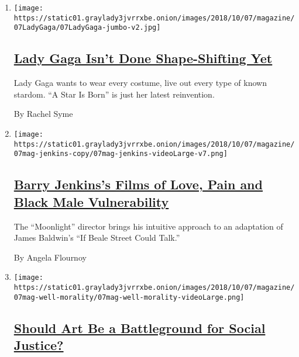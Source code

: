 \begin{enumerate}
\def\labelenumi{\arabic{enumi}.}
\item
  \texttt{[image: https://static01.graylady3jvrrxbe.onion/images/2018/10/07/magazine/07LadyGaga/07LadyGaga-jumbo-v2.jpg]}

  \hypertarget{lady-gaga-isnt-done-shape-shifting-yet}{%
  \subsection{\texorpdfstring{\href{/interactive/2018/10/03/magazine/lady-gaga-movie-star-is-born.html}{Lady
  Gaga Isn't Done Shape-Shifting
  Yet}}{Lady Gaga Isn't Done Shape-Shifting Yet}}\label{lady-gaga-isnt-done-shape-shifting-yet}}

  Lady Gaga wants to wear every costume, live out every type of known
  stardom. ``A Star Is Born'' is just her latest reinvention.

  By Rachel Syme
\item
  \texttt{[image: https://static01.graylady3jvrrxbe.onion/images/2018/10/07/magazine/07mag-jenkins-copy/07mag-jenkins-videoLarge-v7.png]}

  \hypertarget{barry-jenkinss-films-of-love-pain-and-black-male-vulnerability}{%
  \subsection{\texorpdfstring{\href{/interactive/2018/10/04/magazine/barry-jenkins-james-baldwin-if-beale-street-could-talk.html}{Barry
  Jenkins's Films of Love, Pain and Black Male
  Vulnerability}}{Barry Jenkins's Films of Love, Pain and Black Male Vulnerability}}\label{barry-jenkinss-films-of-love-pain-and-black-male-vulnerability}}

  The ``Moonlight'' director brings his intuitive approach to an
  adaptation of James Baldwin's ``If Beale Street Could Talk.''

  By Angela Flournoy
\item
  \texttt{[image: https://static01.graylady3jvrrxbe.onion/images/2018/10/07/magazine/07mag-well-morality/07mag-well-morality-videoLarge.png]}

  \hypertarget{should-art-be-a-battleground-for-social-justice}{%
  \subsection{\texorpdfstring{\href{/interactive/2018/10/03/magazine/morality-social-justice-art-entertainment.html}{Should
  Art Be a Battleground for Social
  Justice?}}{Should Art Be a Battleground for Social Justice?}}\label{should-art-be-a-battleground-for-social-justice}}


\end{enumerate}
